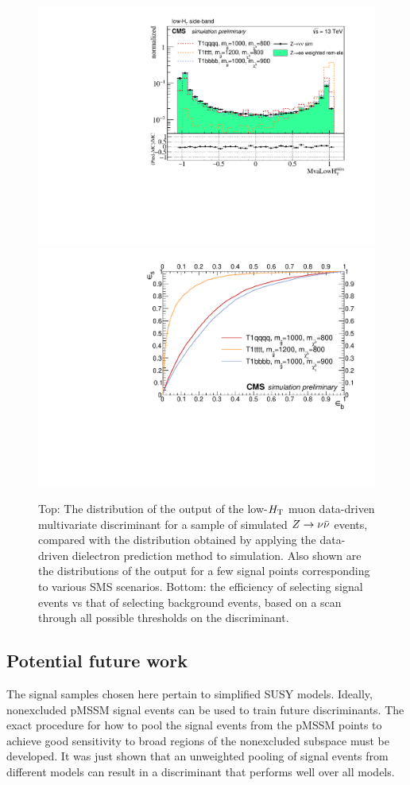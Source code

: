 $$\begin{figure}[tb!]
\centering
\includegraphics[width=0.7\linewidth]{figures/SusySearches/MvaLowHt.pdf}
\includegraphics[width=0.7\linewidth]{figures/SusySearches/RocCurvesLowHt_ZinvVsSUSY.pdf}
\caption{Top: The distribution of the output of the low-$\Ht$ muon data-driven multivariate discriminant for a sample of simulated $\zinv$ events, compared with the distribution obtained by applying the data-driven dielectron prediction method to simulation. Also shown are the distributions of the output for a few signal points corresponding to various SMS scenarios. Bottom: the efficiency of selecting signal events vs that of selecting background events, based on a scan through all possible thresholds on the discriminant.}
\label{fig:SusyBdt2}
\end{figure}

\subsection{Potential future work}
The signal samples chosen here pertain to simplified SUSY models. Ideally, nonexcluded pMSSM signal events can be used to train future discriminants. The exact procedure for how to pool the signal events from the pMSSM points to achieve good sensitivity to broad regions of the nonexcluded subspace must be developed. It was just shown that an unweighted pooling of signal events from different models can result in a discriminant that performs well over all models. 

